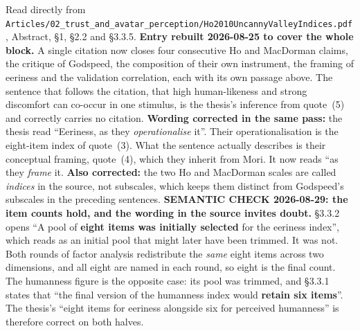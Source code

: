 \documentclass[11pt, a4paper]{article}
\begin{document}
\begin{Form}
  {Read directly from \texttt{\footnotesize Articles/02\_trust\_and\_avatar\_perception/Ho2010UncannyValleyIndices.pdf}, Abstract, \S1, \S2.2 and \S3.3.5. \textbf{Entry rebuilt 2026-08-25 to cover the whole block.} A single citation now closes four consecutive Ho and MacDorman claims, the critique of Godspeed, the composition of their own instrument, the framing of eeriness and the validation correlation, each with its own passage above. The sentence that follows the citation, that high human-likeness and strong discomfort can co-occur in one stimulus, is the thesis's inference from quote~(5) and correctly carries no citation. \textbf{Wording corrected in the same pass:} the thesis read ``Eeriness, as they \emph{operationalise} it''. Their operationalisation is the eight-item index of quote~(3). What the sentence actually describes is their conceptual framing, quote~(4), which they inherit from Mori. It now reads ``as they \emph{frame} it. \textbf{Also corrected:} the two Ho and MacDorman scales are called \emph{indices} in the source, not subscales, which keeps them distinct from Godspeed's subscales in the preceding sentences. \textbf{SEMANTIC CHECK 2026-08-29: the item counts hold, and the wording in the source invites doubt.} \S3.3.2 opens ``A pool of \textbf{eight items was initially selected} for the eeriness index'', which reads as an initial pool that might later have been trimmed. It was not. Both rounds of factor analysis redistribute the \emph{same} eight items across two dimensions, and all eight are named in each round, so eight is the final count. The humanness figure is the opposite case: its pool was trimmed, and \S3.3.1 states that ``the final version of the humanness index would \textbf{retain six items}''. The thesis's ``eight items for eeriness alongside six for perceived humanness'' is therefore correct on both halves.}



\end{Form}
\end{document}
